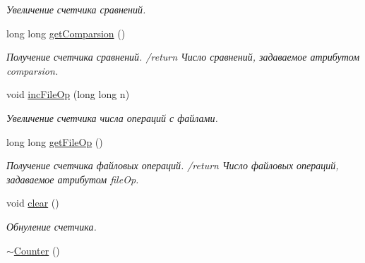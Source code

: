 \begin{DoxyCompactItemize}
\begin{DoxyCompactList}\small\item\em Увеличение счетчика сравнений. \end{DoxyCompactList}\item 
long long \hyperlink{class_counter_a5288fadfdc786d5bf91ae4d04b6a7ab8}{get\+Comparsion} ()
\begin{DoxyCompactList}\small\item\em Получение счетчика сравнений. /return Число сравнений, задаваемое атрибутом comparsion. \end{DoxyCompactList}\item 
void \hyperlink{class_counter_a63310182709c321ad8fe8e78b81d12aa}{inc\+File\+Op} (long long n)
\begin{DoxyCompactList}\small\item\em Увеличение счетчика числа операций с файлами. \end{DoxyCompactList}\item 
long long \hyperlink{class_counter_ae84d6627ab98d69b7dd2e5ea243cffed}{get\+File\+Op} ()
\begin{DoxyCompactList}\small\item\em Получение счетчика файловых операций. /return Число файловых операций, задаваемое атрибутом file\+Op. \end{DoxyCompactList}\item 
void \hyperlink{class_counter_af66c74ac2bc69fa4f30c34377f869596}{clear} ()
\begin{DoxyCompactList}\small\item\em Обнуление счетчика. \end{DoxyCompactList}\item 
\hyperlink{class_counter_a97f4728470ae8eff37d50ef1d6bb0135}{$\sim$\+Counter} ()
\end{DoxyCompactItemize}
